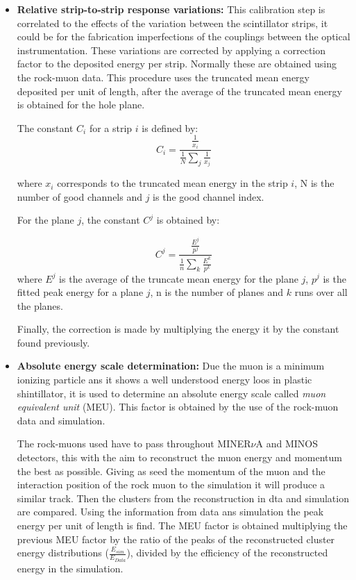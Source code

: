 \begin{itemize}
    \item \textbf{Relative strip-to-strip response variations:} This calibration step is correlated to the effects of the variation between the scintillator strips, it could be for the fabrication imperfections of the couplings between the optical instrumentation. These variations are corrected by applying a correction factor to the deposited energy per strip. Normally these are obtained using the rock-muon data. 
    This procedure uses the truncated mean energy deposited per unit of length, after the average of the truncated mean energy is obtained for the hole plane. 

    The constant $C_i$\cite{MINERvA} for a strip $i$ is defined by:
    \begin{equation}
        C_i = \frac{\frac{1}{x_i}}{\frac{1}{N}\sum_j\frac{1}{x_j}}
        \label{eq:MnvExp:MnvDetector:Calibration:InSitu:ResponsStripConstant}
    \end{equation}

    where $x_i$ corresponds to the truncated mean energy in the strip $i$, N is the number of good channels and $j$ is the good channel index. 

    For the plane $j$, the constant $C^j$ \cite{MINERvA} is obtained by:

    \begin{equation}
        C^j = \frac{\frac{E^j}{p^j}}{\frac{1}{n}\sum_k\frac{E^k}{p^k}}
        \label{eq:MnvExp:MnvDetector:Calibration:InSitu:ResponsPlaneConstant}
    \end{equation}
    where $E^j$ is the average of the truncate mean energy for the plane $j$, $p^j$ is the fitted peak energy for a plane $j$, n is the number of planes and $k$ runs over all the planes.   
    
    Finally, the correction is made by multiplying the energy it by the constant found previously.   
    \item \textbf{Absolute energy scale determination:} Due the muon is a minimum ionizing particle ans it shows a well understood energy loos in plastic shintillator, it is used to determine an absolute energy scale called \textit{muon equivalent unit} (MEU). This factor is obtained by the use of the rock-muon data and simulation. 

    The rock-muons used have to pass throughout MINER$\nu$A and MINOS detectors, this with the aim to reconstruct the muon energy and momentum the best as possible. Giving as seed the momentum of the muon and the interaction position of the rock muon to the simulation it will produce a similar track. Then the clusters from the reconstruction in dta and simulation are compared. Using the information from data ans simulation the peak energy per unit of length is find. The MEU factor is obtained multiplying the previous MEU factor by the ratio of the peaks of the reconstructed cluster energy distributions ($\frac{E_{sim}}{E_{Data}}$), divided by the efficiency of the reconstructed energy in the simulation.


\end{itemize}
